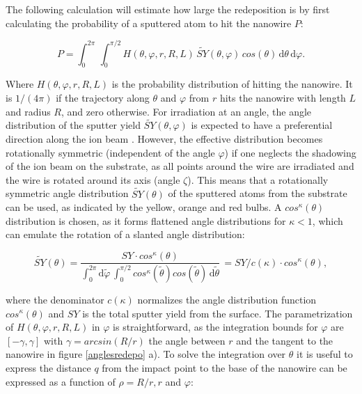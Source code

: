 The following calculation will estimate how large the redeposition is by first calculating the probability of a sputtered atom to hit the nanowire $P$:

\begin{equation}
\label{prob1}
P = \int_0^{2\pi} \! \,\int_0^{\pi/2} \!\! H(\theta,\varphi,r,R,L) \, \tilde{SY}(\theta,\varphi) \,cos(\theta)\,\mathrm{d}\theta \, \mathrm{d}\varphi.
\end{equation}

Where $H(\theta,\varphi,r,R,L)$ is the probability distribution of hitting the nanowire. It is $1/(4\pi)$ if the trajectory along $\theta$ and $\varphi$ from $r$ hits the nanowire with length $L$ and radius $R$, and zero otherwise. For irradiation at an angle, the angle distribution of the sputter yield $\tilde{SY}(\theta,\varphi)$ is expected to have a preferential direction along the ion beam \cite{verdeil_angular_2008}. However, the effective distribution becomes rotationally symmetric (independent of the angle $\varphi$) if one neglects the shadowing of the ion beam on the substrate, as all points around the wire are irradiated and the wire is rotated around its axis (angle $\zeta$). This means that a rotationally symmetric angle distribution $\tilde{SY}(\theta)$ of the sputtered atoms from the substrate can be used, as indicated by the yellow, orange and red bulbs. A $cos^\kappa(\theta)$ distribution is chosen, as it forms flattened angle distributions for $\kappa < 1$, which can emulate the rotation of a slanted angle distribution: 

\begin{equation}
\tilde{SY}(\theta) = \frac{SY \cdot cos^\kappa(\theta)}{\int_0^{2\pi} \! \mathrm{d}\tilde\varphi \,\int_0^{\pi/2} \! cos^\kappa(\tilde\theta) cos(\tilde\theta)\,  \mathrm{d}\tilde\theta} \, = SY /c(\kappa) \cdot cos^\kappa(\theta) ,
\end{equation}

where the denominator $c(\kappa)$ normalizes the angle distribution function $cos^\kappa(\theta)$ and $SY$ is the total sputter yield from the surface. The parametrization of $H(\theta,\varphi,r,R,L)$ in $\varphi$ is straightforward, as the integration bounds for $\varphi$ are $[-\gamma, \gamma]$ with $\gamma = arcsin(R/r)$ the angle between $r$ and the tangent to the nanowire in figure \ref{anglesredepo} a). To solve the integration over $\theta$ it is useful to express the distance $q$ from the impact point to the base of the nanowire can be expressed as a function of $\rho = R/r, r$ and $\varphi$:

